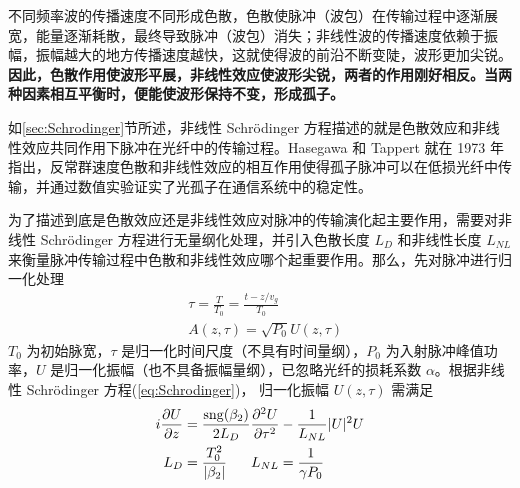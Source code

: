 不同频率波的传播速度不同形成色散，色散使脉冲（波包）在传输过程中逐渐展宽，能量逐渐耗散，最终导致脉冲（波包）消失；非线性波的传播速度依赖于振幅，振幅越大的地方传播速度越快，这就使得波的前沿不断变陡，波形更加尖锐。{\bfseries 因此，色散作用使波形平展，非线性效应使波形尖锐，两者的作用刚好相反。当两种因素相互平衡时，便能使波形保持不变，形成孤子\cite{liangkunmiao}。}

如\ref{sec:Schrodinger}节所述，非线性 Schr\"odinger 方程描述的就是色散效应和非线性效应共同作用下脉冲在光纤中的传输过程。Hasegawa 和 Tappert 就在 1973 年指出，反常群速度色散和非线性效应的相互作用使得孤子脉冲可以在低损光纤中传输，并通过数值实验证实了光孤子在通信系统中的稳定性\cite{Hasegawa}。

为了描述到底是色散效应还是非线性效应对脉冲的传输演化起主要作用，需要对非线性 Schr\"odinger 方程进行无量纲化处理，并引入色散长度 $L_D$ 和非线性长度 $L_{NL}$ 来衡量脉冲传输过程中色散和非线性效应哪个起重要作用。那么，先对脉冲进行归一化处理
\begin{align}
    &\tau=\frac{T}{T_0}=\frac{t-z/v_g}{T_0} \nonumber \\
    &A(z,\tau)=\sqrt{P_0}U(z,\tau)
\end{align}
$T_0$ 为初始脉宽，$\tau$ 是归一化时间尺度（不具有时间量纲），$P_0$ 为入射脉冲峰值功率，$U$ 是归一化振幅（也不具备振幅量纲），已忽略光纤的损耗系数 $\alpha$。根据非线性 Schr\"odinger 方程(\ref{eq:Schrodinger})， 归一化振幅 $U(z,\tau)$ 需满足
\begin{align}
    i\frac{\partial U}{\partial z}&=\frac{\mathrm{sng}(\beta_2)}{2L_D}\frac{\partial^2U}{\partial \tau^2}-\frac{1}{L_{NL}}|U|^2U\\
    L_D&=\frac{T^2_0}{|\beta_2|}\hspace{4ex}L_{NL}=\frac{1}{\gamma P_0} \nonumber
\end{align}

